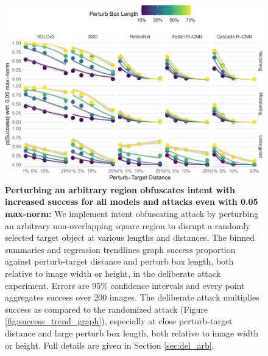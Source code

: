 \begin{figure}[tb]

{\centering \includegraphics[width=1\linewidth]{imgs/arbitrary_trend_graph_normed} 

}

\caption{\textbf{Perturbing an arbitrary region obfuscates intent with increased success for all models and attacks even with 0.05 max-norm:}  We implement intent obfuscating attack by perturbing an arbitrary non-overlapping square region to disrupt a randomly selected target object at various lengths and distances. The binned summaries and regression trendlines graph success proportion against perturb-target distance and perturb box length, both relative to image width or height, in the deliberate attack experiment. Errors are 95\% confidence intervals and every point aggregates success over 200 images. The deliberate attack multiplies success as compared to the randomized attack (Figure \ref{fig:success_trend_graph}), especially at close perturb-target distance and large perturb box length, both relative to image width or height. Full details are given in Section \ref{sec:del_arb}.}\label{fig:arbitrary_trend_graph_normed}
\end{figure}
